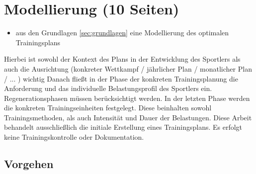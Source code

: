 \chapter{Modellierung (10 Seiten)}
\label{sec:modellierung}
\begin{itemize}
    \item aus den Grundlagen \ref{sec:grundlagen} eine Modellierung des optimalen Trainingsplans 
\end{itemize}

Hierbei ist sowohl der Kontext des Plans in der Entwicklung des Sportlers als auch die Ausrichtung (konkreter Wettkampf / jährlicher Plan / monatlicher Plan / ... ) wichtig
Danach fließt in der Phase der konkreten Trainingsplanung die Anforderung und das individuelle Belastungsprofil des Sportlers ein. Regenerationsphasen müssen berücksichtigt werden. 
In der letzten Phase werden die konkreten Trainingseinheiten festgelegt. Diese beinhalten sowohl Trainingsmethoden, als auch Intensität und Dauer der Belastungen. 
Diese Arbeit behandelt ausschließlich die initiale Erstellung eines Trainingsplans. Es erfolgt keine Trainingskontrolle oder Dokumentation.


\section{Vorgehen}
\label{sec:modellierung:vorgehen}
